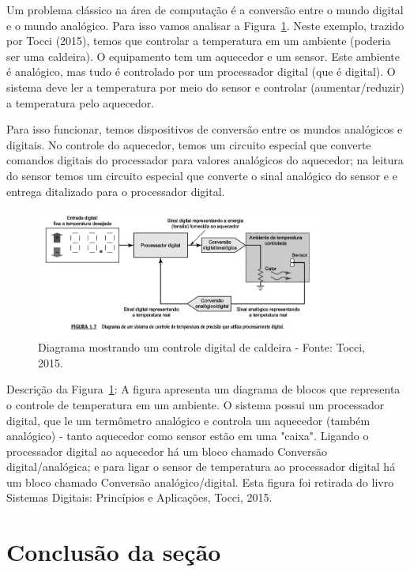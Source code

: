 Um problema clássico na área de computação é a conversão entre o mundo digital e o mundo analógico. Para isso vamos analisar a Figura~\ref{fig:conversorAD}. Neste exemplo, trazido por Tocci (2015), temos que controlar a temperatura em um ambiente (poderia ser uma caldeira). O equipamento tem um aquecedor e um sensor. Este ambiente é analógico, mas tudo é controlado por um processador digital (que é digital). O sistema deve ler a temperatura por meio do sensor e controlar (aumentar/reduzir) a temperatura pelo aquecedor. 

Para  isso funcionar, temos dispositivos de conversão entre os mundos analógicos e digitais. No controle do aquecedor, temos um circuito especial que converte comandos digitais do processador para valores analógicos do aquecedor; na leitura do sensor temos um circuito especial que converte o sinal analógico do sensor e e entrega ditalizado para o processador digital.

\begin{figure}[h]
	\begin{center}
		\includegraphics[width=0.85\textwidth]{img/sinais/convertendoSinais.png}
		\caption{Diagrama mostrando um controle digital de caldeira - Fonte: Tocci, 2015.}
		\label{fig:conversorAD}
	\end{center}
\end{figure}

Descrição da Figura~\ref{fig:conversorAD}: A figura apresenta um diagrama de blocos que representa o controle de temperatura em um ambiente. O sistema possui um processador digital, que le um termômetro analógico e controla um aquecedor (também analógico) - tanto aquecedor como sensor estão em uma "caixa". Ligando o processador digital ao aquecedor há um bloco chamado Conversão digital/analógica; e para ligar o sensor de temperatura ao processador digital há um bloco chamado Conversão analógico/digital. Esta figura foi retirada do livro Sistemas Digitais:  Princípios e Aplicações, Tocci, 2015.

\section{Conclusão da seção}

